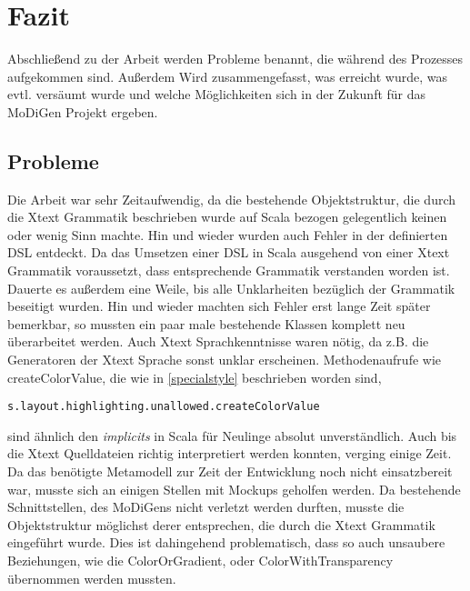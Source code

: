 \chapter{Fazit}
Abschließend zu der Arbeit werden Probleme benannt, die während des Prozesses aufgekommen sind. Außerdem Wird zusammengefasst, was erreicht wurde, was evtl. versäumt wurde und welche Möglichkeiten sich in der Zukunft für das MoDiGen Projekt ergeben.
\section{Probleme}
Die Arbeit war sehr Zeitaufwendig, da die bestehende Objektstruktur, die durch die Xtext Grammatik beschrieben wurde auf Scala bezogen gelegentlich keinen oder wenig Sinn machte. Hin und wieder wurden auch Fehler in der definierten DSL entdeckt. 
Da das Umsetzen einer DSL in Scala ausgehend von einer Xtext Grammatik voraussetzt, dass entsprechende Grammatik verstanden worden ist. Dauerte es außerdem eine Weile, bis alle Unklarheiten bezüglich der Grammatik beseitigt wurden. Hin und wieder machten sich Fehler erst lange Zeit später bemerkbar, so mussten ein paar male bestehende Klassen komplett neu überarbeitet werden. Auch Xtext Sprachkenntnisse waren nötig, da z.B. die Generatoren der Xtext Sprache sonst unklar erscheinen.
Methodenaufrufe wie createColorValue, die wie in \ref{specialstyle} beschrieben worden sind,
\begin{lstlisting}[style = scala, aboveskip =0pt]
s.layout.highlighting.unallowed.createColorValue
\end{lstlisting}sind ähnlich den \textit{implicits} in Scala für Neulinge absolut unverständlich. Auch bis die Xtext Quelldateien richtig interpretiert werden konnten, verging einige Zeit.
Da das benötigte Metamodell zur Zeit der Entwicklung noch nicht einsatzbereit war, musste sich an einigen Stellen mit Mockups geholfen werden.
Da bestehende Schnittstellen, des MoDiGens nicht verletzt werden durften, musste die Objektstruktur möglichst derer entsprechen, die durch die Xtext Grammatik eingeführt wurde. Dies ist dahingehend problematisch, dass so auch unsaubere Beziehungen, wie die ColorOrGradient, oder ColorWithTransparency übernommen werden mussten.
